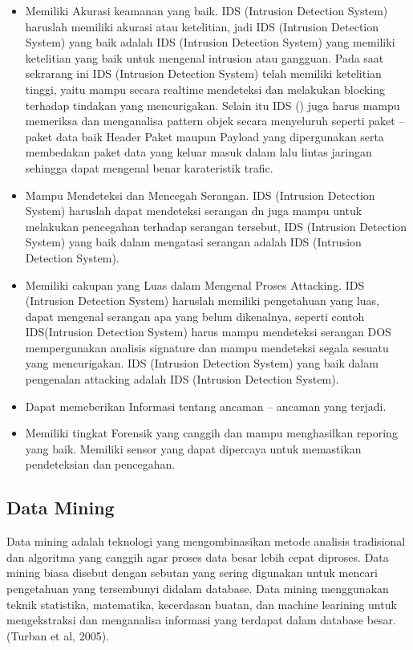 \documentclass[conference]{IEEEtran}
\begin{document}
\begin{itemize}
    \item Memiliki Akurasi keamanan yang baik. IDS (Intrusion Detection System) haruslah memiliki akurasi atau ketelitian, jadi IDS (Intrusion Detection System) yang baik adalah IDS (Intrusion Detection System) yang memiliki ketelitian yang baik untuk mengenal intrusion atau gangguan. Pada saat sekrarang ini IDS (Intrusion Detection System) telah memiliki ketelitian tinggi, yaitu mampu secara realtime mendeteksi dan melakukan blocking terhadap tindakan yang mencurigakan. Selain itu IDS () juga harus mampu memeriksa dan menganalisa pattern objek secara menyeluruh seperti paket – paket data baik Header Paket maupun Payload yang dipergunakan serta membedakan paket data yang keluar masuk dalam lalu lintas jaringan sehingga dapat mengenal benar karateristik trafic.
    \item Mampu Mendeteksi dan Mencegah Serangan. IDS (Intrusion Detection System) haruslah dapat mendeteksi serangan dn juga mampu untuk melakukan pencegahan terhadap serangan tersebut, IDS (Intrusion Detection System) yang baik dalam mengatasi serangan adalah IDS (Intrusion Detection System).
    \item Memiliki cakupan yang Luas dalam Mengenal Proses Attacking. IDS (Intrusion Detection System) haruslah memiliki pengetahuan yang luas, dapat mengenal serangan apa yang belum dikenalnya, seperti contoh IDS(Intrusion Detection System) harus mampu mendeteksi serangan DOS mempergunakan analisis signature dan mampu mendeteksi segala sesuatu yang mencurigakan. IDS (Intrusion Detection System) yang baik dalam pengenalan attacking adalah IDS (Intrusion Detection System).
    \item Dapat memeberikan Informasi tentang ancaman – ancaman yang terjadi.
    \item Memiliki tingkat Forensik yang canggih dan mampu menghasilkan reporing yang baik. Memiliki sensor yang dapat dipercaya untuk memastikan pendeteksian dan pencegahan.
\end{itemize}

\subsection{Data Mining}
Data mining adalah teknologi yang mengombinasikan metode analisis tradisional dan algoritma yang canggih agar
proses data besar lebih cepat diproses. Data mining biasa disebut dengan sebutan yang sering digunakan untuk mencari pengetahuan yang tersembunyi didalam database. Data mining menggunakan teknik statistika, matematika, kecerdasan buatan, dan machine learining untuk mengekstraksi dan menganalisa informasi yang terdapat dalam database besar. (Turban et al, 2005).
\end{document}
